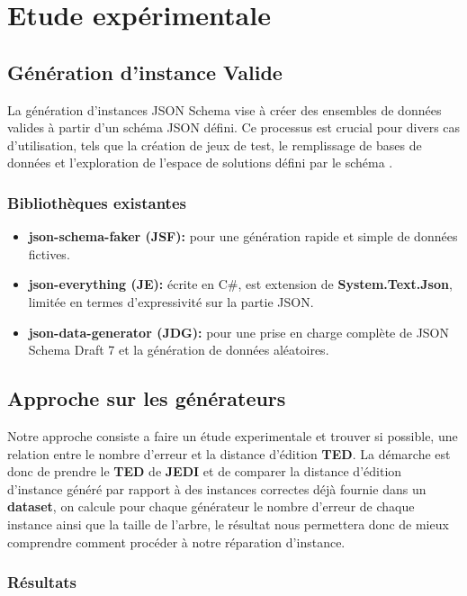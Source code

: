 \chapter{Etude expérimentale}
\section{Génération d'instance Valide}
La génération d'instances JSON Schema vise à créer des ensembles de données valides à partir d'un schéma JSON défini. Ce processus est crucial pour divers cas d'utilisation, tels que la création de jeux de test, le remplissage de bases de données et l'exploration de l'espace de solutions défini par le schéma \cite{GENERATION}.
\subsection{Bibliothèques existantes}
\begin{itemize}
    \item [\textbullet] \textbf{json-schema-faker (JSF):} pour une génération rapide et simple de données fictives\cite{faker}.
    \item [\textbullet] \textbf{json-everything (JE):} écrite en C\#, est extension de \textbf{System.Text.Json}, limitée en termes d'expressivité sur la partie JSON\cite{everything}.
    \item [\textbullet] \textbf{json-data-generator (JDG):} pour une prise en charge complète de JSON Schema Draft 7 et la génération de données aléatoires\cite{data_generator}.
\end{itemize}
 
\section{Approche sur les générateurs}
Notre approche consiste a faire un étude experimentale et trouver si possible, une relation entre le nombre d'erreur et la distance d'édition \textbf{TED}. La démarche est donc de prendre le \textbf{TED} de \textbf{JEDI} et de comparer la distance d'édition d'instance généré par rapport à des instances correctes déjà fournie dans un \textbf{dataset}, on calcule pour chaque générateur le nombre d'erreur de chaque instance ainsi que la taille de l'arbre, le résultat nous permettera donc de mieux comprendre comment procéder à notre réparation d'instance.
 \subsection{Résultats}

